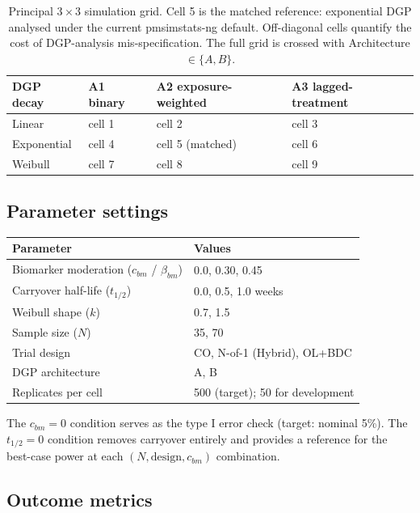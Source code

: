 \documentclass[
]{article}
\newcounter{none} %
\begin{document}
\begin{table}

\caption{\label{tab:grid-table}Principal $3 \times 3$ simulation grid. Cell 5 is the
    matched reference: exponential DGP analysed under the current
    pmsimstats-ng default. Off-diagonal cells quantify the cost of
    DGP-analysis mis-specification. The full grid is crossed with
    Architecture $\in \{A, B\}$.}
\centering
\begin{tabular}[t]{l|l|l|l}
\hline
DGP decay & A1 binary & A2 exposure-weighted & A3 lagged-treatment\\
\hline
Linear & cell 1 & cell 2 & cell 3\\
\hline
Exponential & cell 4 & cell 5 (matched) & cell 6\\
\hline
Weibull & cell 7 & cell 8 & cell 9\\
\hline
\end{tabular}
\end{table}

\subsection{Parameter settings}\label{parameter-settings}

{\def\LTcaptype{none} %
\begin{longtable}[]{@{}ll@{}}
\toprule\noalign{}
Parameter & Values \\
\midrule\noalign{}
\endhead
\bottomrule\noalign{}
\endlastfoot
Biomarker moderation (\(c_{bm}\) / \(\beta_{bm}\)) & 0.0, 0.30, 0.45 \\
Carryover half-life (\(t_{1/2}\)) & 0.0, 0.5, 1.0 weeks \\
Weibull shape (\(k\)) & 0.7, 1.5 \\
Sample size (\(N\)) & 35, 70 \\
Trial design & CO, N-of-1 (Hybrid), OL+BDC \\
DGP architecture & A, B \\
Replicates per cell & 500 (target); 50 for development \\
\end{longtable}
}

The \(c_{bm} = 0\) condition serves as the type I error check
(target: nominal 5\%). The \(t_{1/2} = 0\) condition removes
carryover entirely and provides a reference for the best-case
power at each \((N, \text{design}, c_{bm})\) combination.

\subsection{Outcome metrics}\label{outcome-metrics}
\end{document}
